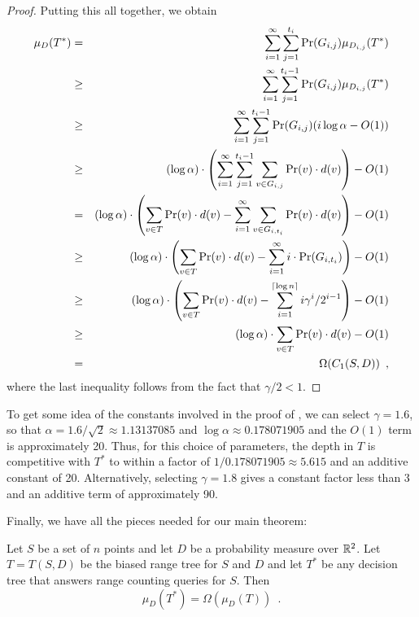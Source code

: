 \documentclass{patmorin}
\newcommand{\depth}{d}
\begin{document}
\begin{proof}
Putting this all together, we obtain
\begin{eqnarray*}
\mu_D(T^*) 
  & = & \sum_{i=1}^{\infty}\sum_{j=1}^{t_i}\Pr(G_{i,j})\mu_{D_{i,j}}(T^*) \\
  & \ge & \sum_{i=1}^{\infty}
    \sum_{j=1}^{t_i-1}\Pr(G_{i,j})\mu_{D_{i,j}}(T^*) \\
  & \ge & \sum_{i=1}^{\infty}\sum_{j=1}^{t_i-1}
           \Pr(G_{i,j})( i\log\alpha -O(1)) \\
  & \ge & (\log\alpha)\cdot
       \left(
         \sum_{i=1}^{\infty}\sum_{j=1}^{t_i-1}
		\sum_{v\in G_{i,j}}\Pr(v)\cdot\depth(v) 
       \right) - O(1)
         \\
  & = & (\log\alpha)\cdot
       \left(\sum_{v\in T}\Pr(v)\cdot \depth(v)
          -    \sum_{i=1}^{\infty}
		\sum_{v\in G_{i,t_i}}\Pr(v)\cdot\depth(v)
       \right) - O(1)\\
  & \ge & (\log\alpha)\cdot
       \left(\sum_{v\in T}\Pr(v)\cdot \depth(v)
          -    \sum_{i=1}^{\infty}i\cdot\Pr(G_{i,t_i})
       \right) - O(1) \\
  & \ge & (\log\alpha)\cdot
       \left(\sum_{v\in T}\Pr(v)\cdot \depth(v)
          -    \sum_{i=1}^{\ceil{\log n}}i\gamma^i/2^{i-1}
       \right) - O(1) \\
  & \ge &  (\log\alpha)\cdot\sum_{v\in T}\Pr(v)\cdot \depth(v) - O(1) \\
  & = & \Omega(C_1(S,D)) \enspace ,
\end{eqnarray*}
where the last inequality follows from the fact that $\gamma/2 < 1$. 
\end{proof}

To get some idea of the constants involved in the proof of
, we can select $\gamma=1.6$, so that
$\alpha=1.6/\sqrt{2}\approx 1.13137085$ and $\log \alpha \approx
0.178071905$ and the $O(1)$ term is approximately 20.  Thus, for this
choice of parameters, the depth in $T$ is competitive with $T^*$ to
within a factor of $1/0.178071905\approx 5.615$ and an additive
constant of 20.  Alternatively, selecting $\gamma=1.8$ gives a
constant factor less than 3 and an additive term of approximately 90.

Finally, we have all the pieces needed for our main theorem:

\begin{thm}
Let $S$ be a set of $n$ points and let $D$ be a probability measure
over $\mathbb{R}^2$.
Let $T=T(S,D)$ be the biased range tree for $S$ and $D$ and 
let $T^*$ be any decision
tree that answers range counting queries for $S$.  Then
\[
  \mu_D(T^*) = \Omega(\mu_D(T)) \enspace .
\]
\end{thm}
\end{document}
